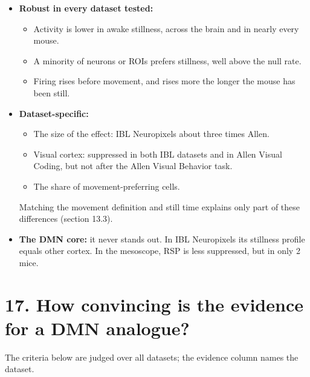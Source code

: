 \documentclass[10pt,a4paper]{article}
\begin{document}
\begin{itemize}
\item \textbf{Robust in every dataset tested:} 
\begin{itemize}
\item Activity is lower in awake stillness, across the brain and in nearly every mouse.
\item A minority of neurons or ROIs prefers stillness, well above the null rate.
\item Firing rises before movement, and rises more the longer the mouse has been still.
\end{itemize}
\item \textbf{Dataset-specific:} 
\begin{itemize}
\item The size of the effect: IBL Neuropixels about three times Allen.
\item Visual cortex: suppressed in both IBL datasets and in Allen Visual Coding, but not after the Allen Visual Behavior task.
\item The share of movement-preferring cells.
\end{itemize}
 Matching the movement definition and still time explains only part of these differences (section 13.3).
\item \textbf{The DMN core:} it never stands out. In IBL Neuropixels its stillness profile equals other cortex. In the mesoscope, RSP is less suppressed, but in only 2 mice.
\end{itemize}
\section{17. How convincing is the evidence for a DMN analogue?}
The criteria below are judged over all datasets; the evidence column names the dataset.
\end{document}
